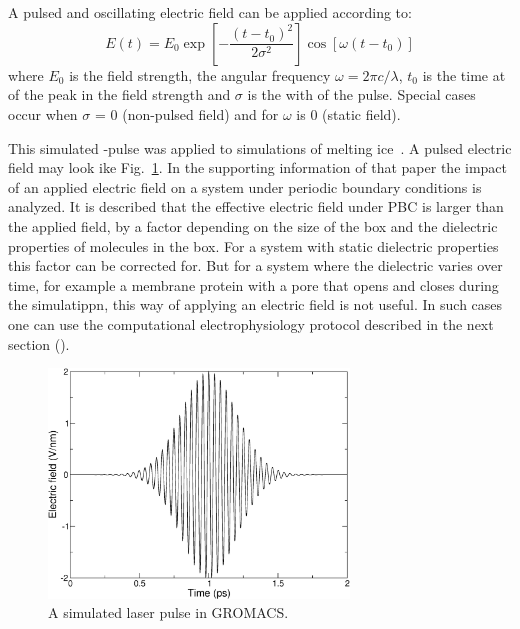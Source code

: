 \section{}
A pulsed and oscillating electric field can be applied according to:
\begin{equation}
E(t) = E_0 \exp\left[-\frac{(t-t_0)^2}{2\sigma^2}\right]\cos\left[\omega (t-t_0)\right]
\label{eq_efield}
\end{equation}
where $E_0$ is the field strength, the angular frequency \mbox{$\omega = 2\pi c/\lambda$}, $t_0$ is
the time at of the peak in the field strength and $\sigma$ is the with
of the pulse. Special cases occur when $\sigma$ = 0 (non-pulsed field)
and for $\omega$ is 0 (static field).

This simulated -pulse was applied to
simulations of melting ice~\cite{Caleman2008a}. A pulsed electric field may
look ike Fig.~\ref{fig:field}. In the supporting
information of that paper the impact of an applied electric field on a
system under periodic boundary conditions is analyzed. It is described
that the effective electric field under PBC is larger than the applied
field, by a factor depending on the size of the box and the dielectric
properties of molecules in the box. For a system with static dielectric
properties this factor can be corrected for. But for a system where
the dielectric varies over time, for example a membrane protein with
a pore that opens and closes during the simulatippn, this way of applying
an electric field is not useful. In such cases one can use the computational
electrophysiology protocol described in the next section ().
\begin{figure}[ht]
\centerline{\includegraphics[width=8cm]{plots/field}}
\caption {A simulated laser pulse in GROMACS.}
\label{fig:field}
\end{figure}

